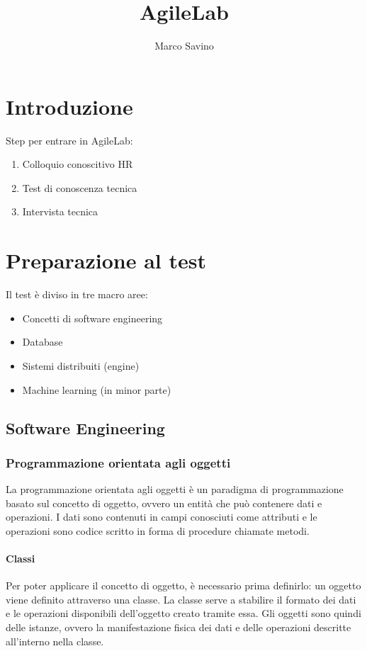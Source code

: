\documentclass{article}
\title{AgileLab}
\author{Marco Savino}
\date{}
\begin{document}
\maketitle

\section{Introduzione}
    Step per entrare in AgileLab:
    \begin{enumerate}
        \item Colloquio conoscitivo HR
        \item Test di conoscenza tecnica
        \item Intervista tecnica
    \end{enumerate}
    
\section{Preparazione al test}
    Il test è diviso in tre macro aree:
    \begin{itemize}
        \item Concetti di software engineering
        \item Database
        \item Sistemi distribuiti (engine)
        \item Machine learning (in minor parte)
    \end{itemize}
    \subsection{Software Engineering}
        \subsubsection{Programmazione orientata agli oggetti}
            La programmazione orientata agli oggetti è un paradigma di programmazione basato sul concetto di oggetto, ovvero un entità che può contenere dati e operazioni. I dati sono contenuti in campi conosciuti come attributi e le operazioni sono codice scritto in forma di procedure chiamate metodi.
            \paragraph{Classi} Per poter applicare il concetto di oggetto, è necessario prima definirlo: un oggetto viene definito attraverso una classe. La classe serve a stabilire il formato dei dati e le operazioni disponibili dell'oggetto creato tramite essa. Gli oggetti sono quindi delle istanze, ovvero la manifestazione fisica dei dati e delle operazioni descritte all'interno nella classe.
            
\end{document}

